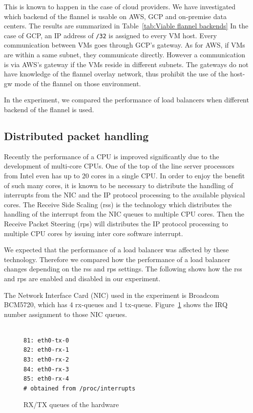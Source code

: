 This is known to happen in the case of cloud providers.  
We have investigated which backend of the flannel is usable on AWS, GCP and on-premise data centers.
The results are summarized in Table~\ref{tab:Viable flannel backends}
%
In the case of GCP, an IP address of {\tt /32} is assigned to every VM host.
Every communication between VMs goes through GCP's gateway.
As for AWS, if VMs are within a same subnet, they communicate directly.
However a communication is via AWS's gateway if the VMs reside in different subnets.
The gateways do not have knowledge of the flannel overlay network, 
thus prohibit the use of the host-gw mode of the flannel on those environment.  

In the experiment, we compared the performance of load balancers when different backend of the flannel is used. 

\subsection{Distributed packet handling}

Recently the performance of a CPU is improved significantly due to the development of multi-core CPUs.
One of the top of the line server processors from Intel even has up to 20 cores in a single CPU.
In order to enjoy the benefit of such many cores, 
it is known to be necessary to distribute the handling of interrupts from the NIC and the IP protocol processing
to the available physical cores.
The Receive Side Scaling (rss)\cite{TomHerbert} is the technology 
which distributes the handling of the interrupt from the NIC queues to multiple CPU cores.
Then the Receive Packet Steering (rps)\cite{TomHerbert} will distributes the IP protocol processing 
to multiple CPU cores by issuing inter core software interrupt.

We expected that the performance of a load balancer was affected  by these technology.
Therefore we compared how the performance of a load balancer changes depending on the rss and rps settings.
The following shows how the rss and rps are enabled and disabled in our experiment. 

The Network Interface Card (NIC) used in the experiment is Broadcom BCM5720, which has 4 rx-queues and 1 tx-queue.
Figure~\ref{fig:rx-queue} shows  the IRQ number assignment to those NIC queues.
 
\begin{figure}
\begin{minipage}{0.8\columnwidth}
\small
\begin{verbatim}

81: eth0-tx-0
82: eth0-rx-1
83: eth0-rx-2
84: eth0-rx-3
85: eth0-rx-4
# obtained from /proc/interrupts 

\end{verbatim}
\end{minipage}
\caption{RX/TX queues of the hardware}
\label{fig:rx-queue}
\end{figure}

